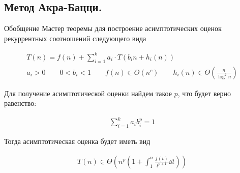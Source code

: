 \subsection{%
  Метод Акра-Бацци.%
}

Обобщение Мастер теоремы для построение асимптотических оценок рекуррентных
соотношений следующего вида

\begin{align*}
  T(n) = f(n) + \sum_{i = 1}^{k} a_{i} \cdot T(b_{i} n + h_{i}(n))\\
  a_{i} > 0 \qquad
  0 < b_{i} < 1 \qquad
  f(n) \in O(n^{c}) \qquad
  h_{i}(n) \in \Theta \left(\frac{n}{\log^{2} n}\right)
\end{align*}

Для получение асимптотической оценки найдем такое \(p\), что будет верно
равенство:

\begin{align*}
  \sum_{i = 1}^{k} a_{i} b_{i}^{p} = 1
\end{align*}

Тогда асимптотическая оценка будет иметь вид

\begin{align*}
  T(n) \in \Theta \left(
    n^{p} \left( 1 + \int_{1}^{n} \frac{f(t)}{t^{p + 1}} \dd t \right)
  \right)
\end{align*}
